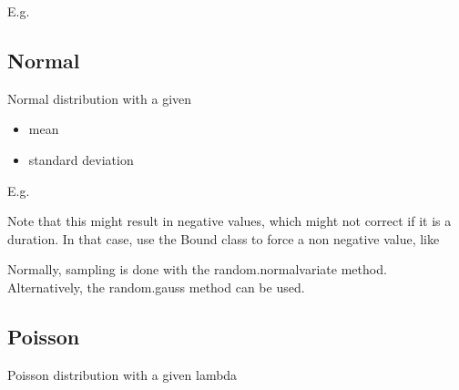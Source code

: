 \documentclass[letterpaper,10pt,english]{sphinxmanual}
\begin{document}
E.g.

\begin{sphinxVerbatim}[commandchars=\\\{\}]
   
\end{sphinxVerbatim}


\subsection{Normal}
\label{\detokenize{Distributions:normal}}
Normal distribution with a given
\begin{itemize}
\item {} 
mean

\item {} 
standard deviation

\end{itemize}

E.g.

\begin{sphinxVerbatim}[commandchars=\\\{\}]
     
\end{sphinxVerbatim}

Note that this might result in negative values, which might not correct if it is a duration. In that case,
use the Bound class to force a non negative value, like

\begin{sphinxVerbatim}[commandchars=\\\{\}]
  
   
\end{sphinxVerbatim}

Normally, sampling is done with the random.normalvariate method. Alternatively, the random.gauss method can be used.


\subsection{Poisson}
\label{\detokenize{Distributions:poisson}}
Poisson distribution with a given lambda
\end{document}
